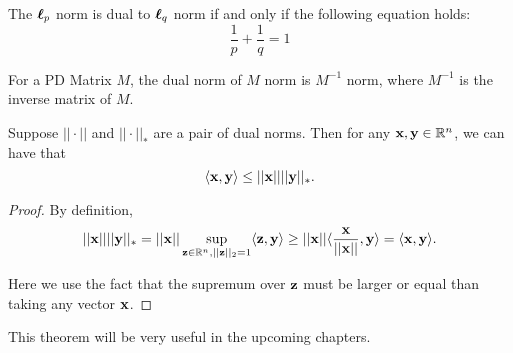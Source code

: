 \documentclass[../main.tex]{subfiles}
\begin{document}
\begin{claim}
	The $\boldsymbol{\ell}_p$ norm is dual to $\boldsymbol{\ell}_q$ norm if and only if the following equation holds:
	\begin{equation}
	\frac{1}{p} + \frac{1}{q} = 1
	\end{equation}
\end{claim}

\begin{claim}
	For a PD Matrix $M$, the dual norm of $M$ norm is $M^{-1}$ norm, where $M^{-1}$ is the inverse matrix of $M$.
\end{claim}

\begin{theorem}
	Suppose $||\cdot||$ and $||\cdot||_*$ are a pair of dual norms. Then for any $\mathbf{x}, \mathbf{y} \in \mathbb{R}^n$, we can have that 
	\begin{equation}
	\langle\mathbf{x},\mathbf{y}\rangle \leq ||\mathbf{x}|| ||\mathbf{y}||_*.
	\end{equation}
\end{theorem}

\begin{proof}
	By definition, 
	\begin{equation*}
	||\mathbf{x}|| ||\mathbf{y}||_* = ||\mathbf{x}|| \sup\limits_{\mathbf{z} \in \mathbb{R}^n, ||\mathbf{z}||_2 = 1}  \langle \mathbf{z}, \mathbf{y} \rangle \geq ||\mathbf{x}|| \langle \frac{\mathbf{x}}{||\mathbf{x}||}, \mathbf{y} \rangle =  \langle\mathbf{x}, \mathbf{y} \rangle.
	\end{equation*}
	
	Here we use the fact that the supremum over $\mathbf{z}$ must be larger or equal than taking any vector $\mathbf{x}$.
\end{proof}

This theorem will be very useful in the upcoming chapters.
\end{document}
